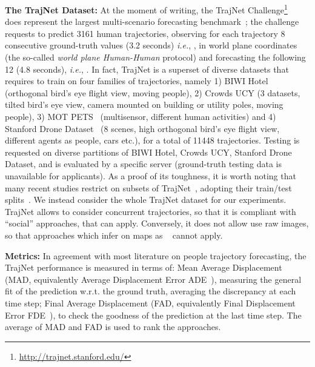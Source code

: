 \documentclass[a4paper,conference]{IEEEtran}
\begin{document}
\noindent\textbf{The TrajNet Dataset:}
At the moment of writing, the TrajNet Challenge\footnote{\url{http://trajnet.stanford.edu/}} ~\cite{sadeghiankosaraju2018trajnet} does represent the largest multi-scenario forecasting benchmark~\cite{rudenko2019human}; the challenge requests to predict 3161 human trajectories, observing for each trajectory 8 consecutive ground-truth values (3.2 seconds) \emph{i.e.}, , in world plane coordinates (the so-called \emph{world plane Human-Human} protocol) and fo\-re\-cas\-ting the following 12 (4.8 seconds), \emph{i.e.}, .
In fact, TrajNet is a superset of diverse datasets that requires to train on four families of trajectories, namely 1) BIWI Hotel~\cite{pellegrini2009iccv} (orthogonal bird's eye flight view, moving people), 2) Crowds UCY \cite{lerner2007crowds} (3 datasets, tilted bird's eye view, camera mounted on building or utility poles, moving people), 3) MOT PETS~\cite{PETS2009} (multi\-sensor, different human activities) and 4) Stanford Drone Dataset~\cite{robicquet2016learning} (8 scenes, high orthogonal bird's eye flight view, different agents as people, cars etc.), for a total of 11448 trajectories. Testing is requested on diverse partitions of BIWI Hotel, Crowds UCY, Stanford Drone Dataset, and is evaluated by a specific server (ground-truth testing data is unavailable for applicants). As a proof of its toughness, it is worth noting that many recent studies restrict on subsets of TrajNet~\cite{deo2020trajectory,haddad2020self,ridel2020scene}, adopting their train/test splits~\cite{van2019safecritic}.  We instead consider the whole TrajNet dataset for our experiments. TrajNet allows to consider concurrent trajectories, so that it is compliant with ``social'' approaches, that can apply. Conversely, it does not allow use raw images, so that approaches which infer on maps as ~\cite{sadeghian2019sophie,ivanovic2019trajectron,salzmann2020trajectron++} cannot apply.   
\vspace{0.2cm}

\noindent\textbf{Metrics:} In agreement with most literature on people trajectory forecasting, the TrajNet performance is measured in terms of: Mean Average Displacement (MAD, equivalently  Average Displacement Error ADE~\cite{ivanovic2019trajectron}), measuring the general fit of the prediction w.r.t. the ground truth, averaging the discrepancy at each time step; Final Average Displacement (FAD, equivalently Final Displacement Error FDE~\cite{ivanovic2019trajectron}), to check the goodness of the prediction at the last time step.
The average of MAD and FAD is used to rank the approaches.
\vspace{0.2cm}
\end{document}
